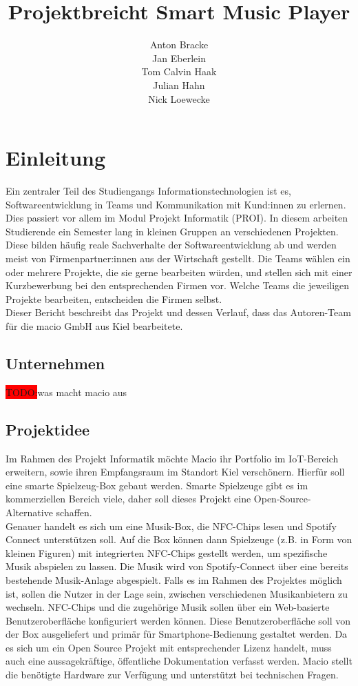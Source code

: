 \documentclass[10pt, a4paper]{article}
\title{Projektbreicht Smart Music Player}
\author{Anton Bracke\\Jan Eberlein\\Tom Calvin Haak\\Julian Hahn\\Nick Loewecke}
\begin{document}
\maketitle
\newpage
\tableofcontents
\newpage

\section{Einleitung}
Ein zentraler Teil des Studiengangs \glqq Informationstechnologien\grqq{} ist es, Softwareentwicklung in Teams und Kommunikation mit Kund:innen zu erlernen. \cite{Qualifikationsziele_Informationstechnologien}
Dies passiert vor allem im Modul \glqq Projekt Informatik (PROI)\grqq{}.
In diesem arbeiten Studierende ein Semester lang in kleinen Gruppen an verschiedenen Projekten.
Diese bilden häufig reale Sachverhalte der Softwareentwicklung ab und werden meist von Firmenpartner:innen aus der Wirtschaft gestellt.
Die Teams wählen ein oder mehrere Projekte, die sie gerne bearbeiten würden, und stellen sich mit einer Kurzbewerbung bei den entsprechenden Firmen vor.
Welche Teams die jeweiligen Projekte bearbeiten, entscheiden die Firmen selbst.
\\
Dieser Bericht beschreibt das Projekt und dessen Verlauf, dass das Autoren-Team für die macio GmbH aus Kiel bearbeitete.

\subsection{Unternehmen}
\colorbox{red}{TODO:}was macht macio aus
\subsection{Projektidee}
Im Rahmen des Projekt Informatik möchte Macio ihr Portfolio im IoT-Bereich erweitern, sowie ihren Empfangsraum im Standort Kiel verschönern.
Hierfür soll eine smarte Spielzeug-Box gebaut werden.
Smarte Spielzeuge gibt es im kommerziellen Bereich viele, daher soll dieses Projekt eine Open-Source-Alternative schaffen.\\
Genauer handelt es sich um eine Musik-Box, die NFC-Chips lesen und Spotify Connect unterstützen soll.
Auf die Box können dann Spielzeuge (z.B. in Form von kleinen Figuren) mit integrierten NFC-Chips gestellt werden, um spezifische Musik abspielen zu lassen.
Die Musik wird von Spotify-Connect über eine bereits bestehende Musik-Anlage abgespielt.
Falls es im Rahmen des Projektes möglich ist, sollen die Nutzer in der Lage sein, zwischen verschiedenen Musikanbietern zu wechseln.
NFC-Chips und die zugehörige Musik sollen über ein Web-basierte Benutzeroberfläche konfiguriert werden können.
Diese Benutzeroberfläche soll von der Box ausgeliefert und primär für Smartphone-Bedienung gestaltet werden.
Da es sich um ein Open Source Projekt mit entsprechender Lizenz handelt, muss auch eine aussagekräftige, öffentliche Dokumentation verfasst werden.
Macio stellt die benötigte Hardware zur Verfügung und unterstützt bei technischen Fragen.
\end{document}
